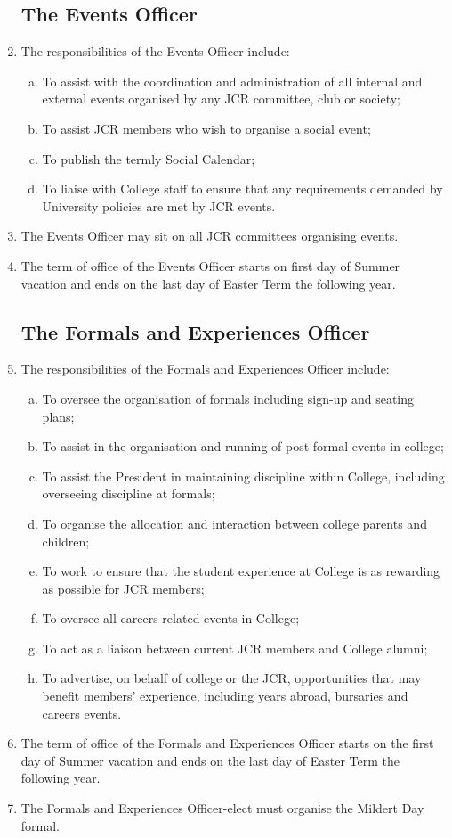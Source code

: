 \documentclass[12pt]{article}
\begin{document}
\begin{enumerate}
    \subsection{The Events Officer}
    \item The responsibilities of the Events Officer include:
    \begin{enumerate}[(a)]
        \item To assist with the coordination and administration of all internal and external events organised by any JCR committee, club or society;
        \item To assist JCR members who wish to organise a social event;
        \item To publish the termly Social Calendar;
        \item To liaise with College staff to ensure that any requirements demanded by University policies are met by JCR events.
    \end{enumerate}
    \item The Events Officer may sit on all JCR committees organising events.
    \item The term of office of the Events Officer starts on first day of Summer vacation and ends on the last day of Easter Term the following year.
    \subsection{The Formals and Experiences Officer}
    \item The responsibilities of the Formals and Experiences Officer include:
    \begin{enumerate}[(a)]
        \item To oversee the organisation of formals including sign-up and seating plans;
        \item To assist in the organisation and running of post-formal events in college;
        \item To assist the President in maintaining discipline within College, including overseeing discipline at formals;
        \item To organise the allocation and interaction between college parents and children;
        \item To work to ensure that the student experience at College is as rewarding as possible for JCR members;
        \item To oversee all careers related events in College;
        \item To act as a liaison between current JCR members and College alumni;
        \item To advertise, on behalf of college or the JCR, opportunities that may benefit members' experience, including years abroad, bursaries and careers events.
    \end{enumerate}
    \item The term of office of the Formals and Experiences Officer starts on the first day of Summer vacation and ends on the last day of Easter Term the following year.
    \item The Formals and Experiences Officer-elect must organise the Mildert Day formal.

\end{enumerate}
\end{document}
